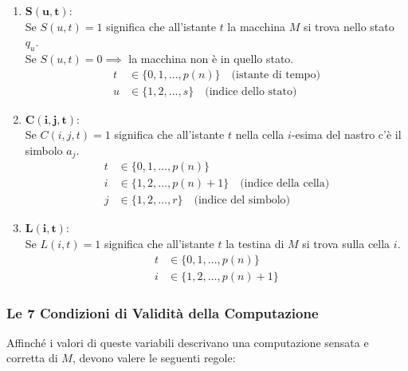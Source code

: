 \begin{enumerate}
    \item $\mathbf{S(u, t)}$: \\
    Se $S(u, t) = 1$ significa che all'istante $t$ la macchina $M$ si trova nello stato $q_u$. \\
    Se $S(u, t) = 0 \implies$ la macchina non è in quello stato.
    \begin{align*}
        t &\in \{0, 1, \dots, p(n)\} \quad \text{(istante di tempo)} \\
        u &\in \{1, 2, \dots, s\} \quad \text{(indice dello stato)}
    \end{align*}

    \item $\mathbf{C(i, j, t)}$: \\
    Se $C(i, j, t) = 1$ significa che all'istante $t$ nella cella $i$-esima del nastro c'è il simbolo $a_j$.
    \begin{align*}
        t &\in \{0, 1, \dots, p(n)\} \\
        i &\in \{1, 2, \dots, p(n)+1\} \quad \text{(indice della cella)} \\
        j &\in \{1, 2, \dots, r\} \quad \text{(indice del simbolo)}
    \end{align*}

    \item $\mathbf{L(i, t)}$: \\
    Se $L(i, t) = 1$ significa che all'istante $t$ la testina di $M$ si trova sulla cella $i$.
    \begin{align*}
        t &\in \{0, 1, \dots, p(n)\} \\
        i &\in \{1, 2, \dots, p(n)+1\}
    \end{align*}
\end{enumerate}

\vspace{0.6cm}
\subsubsection*{Le 7 Condizioni di Validità della Computazione}
Affinché i valori di queste variabili descrivano una computazione sensata e corretta di $M$, devono valere le seguenti regole:

